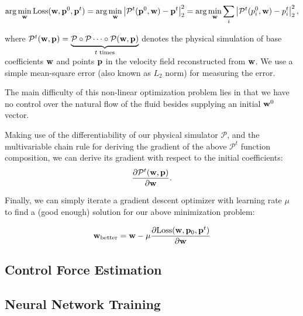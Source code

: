 $$\arg\min_{\vb{w}} \text{Loss}(\vb{w}, \vb{p}^0, \vb{p}^t)
= \arg\min_{\vb{w}} \left| \mathcal{P}^{t}(\vb{p}^0, \vb{w})
- \vb{p}^t\right|_2^2 = \arg\min_{\vb{w}}
\sum_{i}\left|\mathcal{P}^{t}(p^0_i, \vb{w}) - p^t_i\right|_2^2, $$

where $\mathcal{P}^t(\vb{w}, \vb{p}) = \underbrace{\mathcal{P} \circ
\mathcal{P} \dots \circ \mathcal{P}(\vb{w}, \vb{p})}_{t \text{ times}}$
denotes the physical simulation of base coefficients $\vb{w}$ and 
points $\vb{p}$ in the velocity field reconstructed from $\vb{w}$. We
use a simple mean-square error (also known as $L_2$ norm) for measuring the error.

The main difficulty of this non-linear optimization problem lies in that we have
no control over the natural flow of the fluid besides supplying an initial
$\vb{w}^0$ vector.

Making use of the differentiability of our physical simulator $\mathcal{P}$, and
the multivariable chain rule for deriving the gradient of the above
$\mathcal{P}^t$ function composition, we can derive its gradient with respect to
the initial coefficients:
$$\frac{\partial \mathcal{P}^t(\vb{w},\vb{p})}{\partial \vb{w}}.$$


Finally, we can simply iterate a gradient descent optimizer with learning
rate $\mu$ to find a (good enough) solution for our above minimization problem:


$$\vb{w}_{\text{better}} = \vb{w} - \mu
\frac{
    \partial\text{Loss}(\vb{w}, \vb{p}_0, \vb{p}^t)
}{
    \partial \vb{w}
}$$

\subsection{Control Force Estimation}
\subsection{Neural Network Training}
